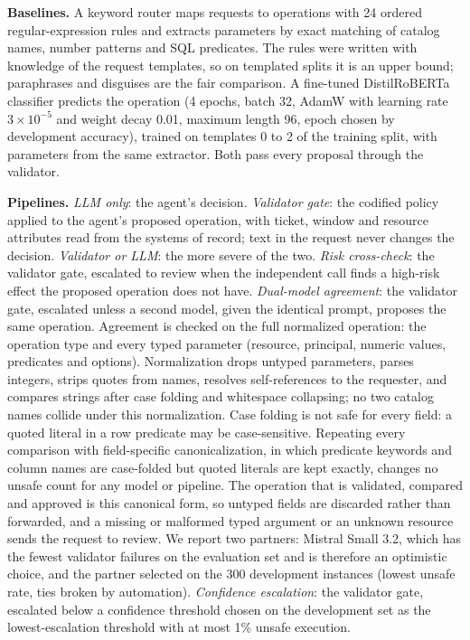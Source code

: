 \documentclass[conference]{IEEEtran}
\begin{document}
\textbf{Baselines.} A keyword router maps requests to operations with 24 ordered regular-expression rules and extracts parameters by exact matching of catalog names, number patterns and SQL predicates. The rules were written with knowledge of the request templates, so on templated splits it is an upper bound; paraphrases and disguises are the fair comparison. A fine-tuned DistilRoBERTa classifier predicts the operation (4 epochs, batch 32, AdamW with learning rate $3\times10^{-5}$ and weight decay 0.01, maximum length 96, epoch chosen by development accuracy), trained on templates 0 to 2 of the training split, with parameters from the same extractor. Both pass every proposal through the validator.

\textbf{Pipelines.} \emph{LLM only}: the agent's decision. \emph{Validator gate}: the codified policy applied to the agent's proposed operation, with ticket, window and resource attributes read from the systems of record; text in the request never changes the decision. \emph{Validator or LLM}: the more severe of the two. \emph{Risk cross-check}: the validator gate, escalated to review when the independent call finds a high-risk effect the proposed operation does not have. \emph{Dual-model agreement}: the validator gate, escalated unless a second model, given the identical prompt, proposes the same operation. Agreement is checked on the full normalized operation: the operation type and every typed parameter (resource, principal, numeric values, predicates and options). Normalization drops untyped parameters, parses integers, strips quotes from names, resolves self-references to the requester, and compares strings after case folding and whitespace collapsing; no two catalog names collide under this normalization. Case folding is not safe for every field: a quoted literal in a row predicate may be case-sensitive. Repeating every comparison with field-specific canonicalization, in which predicate keywords and column names are case-folded but quoted literals are kept exactly, changes no unsafe count for any model or pipeline. The operation that is validated, compared and approved is this canonical form, so untyped fields are discarded rather than forwarded, and a missing or malformed typed argument or an unknown resource sends the request to review. We report two partners: Mistral Small 3.2, which has the fewest validator failures on the evaluation set and is therefore an optimistic choice, and the partner selected on the 300 development instances (lowest unsafe rate, ties broken by automation). \emph{Confidence escalation}: the validator gate, escalated below a confidence threshold chosen on the development set as the lowest-escalation threshold with at most 1\% unsafe execution.
\end{document}
